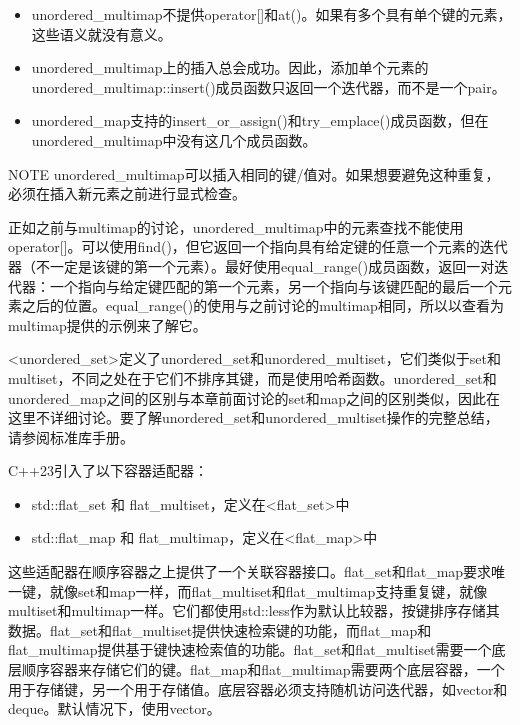\begin{itemize}
\item
unordered\_multimap不提供operator[]和at()。如果有多个具有单个键的元素，这些语义就没有意义。

\item
unordered\_multimap上的插入总会成功。因此，添加单个元素的unordered\_multimap::insert()成员函数只返回一个迭代器，而不是一个pair。

\item
unordered\_map支持的insert\_or\_assign()和try\_emplace()成员函数，但在unordered\_multimap中没有这几个成员函数。
\end{itemize}

\begin{myNotic}{NOTE}
unordered\_multimap可以插入相同的键/值对。如果想要避免这种重复，必须在插入新元素之前进行显式检查。
\end{myNotic}

正如之前与multimap的讨论，unordered\_multimap中的元素查找不能使用operator[]。可以使用find()，但它返回一个指向具有给定键的任意一个元素的迭代器（不一定是该键的第一个元素）。最好使用equal\_range()成员函数，返回一对迭代器：一个指向与给定键匹配的第一个元素，另一个指向与该键匹配的最后一个元素之后的位置。equal\_range()的使用与之前讨论的multimap相同，所以以查看为multimap提供的示例来了解它。


<unordered\_set>定义了unordered\_set和unordered\_multiset，它们类似于set和multiset，不同之处在于它们不排序其键，而是使用哈希函数。unordered\_set和unordered\_map之间的区别与本章前面讨论的set和map之间的区别类似，因此在这里不详细讨论。要了解unordered\_set和unordered\_multiset操作的完整总结，请参阅标准库手册。



C++23引入了以下容器适配器：

\begin{itemize}
\item
std::flat\_set 和 flat\_multiset，定义在<flat\_set>中

\item
std::flat\_map 和 flat\_multimap，定义在<flat\_map>中
\end{itemize}

这些适配器在顺序容器之上提供了一个关联容器接口。flat\_set和flat\_map要求唯一键，就像set和map一样，而flat\_multiset和flat\_multimap支持重复键，就像multiset和multimap一样。它们都使用std::less作为默认比较器，按键排序存储其数据。flat\_set和flat\_multiset提供快速检索键的功能，而flat\_map和flat\_multimap提供基于键快速检索值的功能。flat\_set和flat\_multiset需要一个底层顺序容器来存储它们的键。flat\_map和flat\_multimap需要两个底层容器，一个用于存储键，另一个用于存储值。底层容器必须支持随机访问迭代器，如vector和deque。默认情况下，使用vector。

